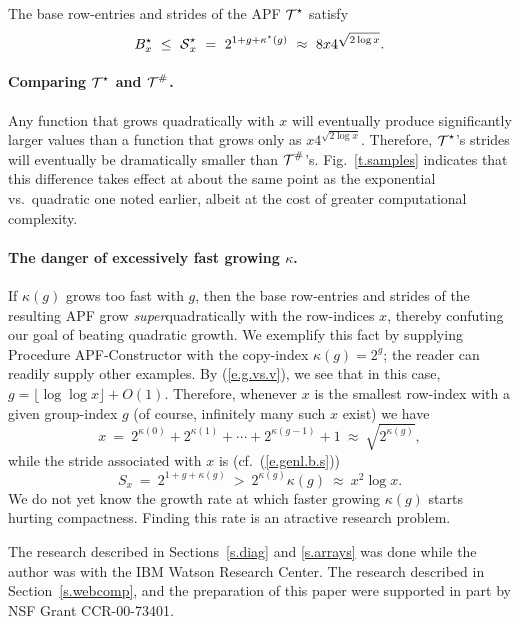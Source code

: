 \begin{prop}
The base row-entries and strides of the APF $\mbox{$\cal T$}^\star$ satisfy
\[ B^\star_x \ \leq \ \mbox{$\cal S$}^\star_x \ = \ 2^{1 + g +
    \kappa^\star(g)} \ \approx \ 8x 4^{\sqrt{2 \log x}}.  \]
\end{prop}

\paragraph{Comparing $\mbox{$\cal T$}^\star$ and $\mbox{$\cal T$}^\#$.}
Any function that grows quadratically with $x$ will eventually produce
significantly larger values than a function that grows only as $x
4^{\sqrt{2\log x}}$.  Therefore, $\mbox{$\cal T$}^\star$'s strides will eventually
be dramatically smaller than $\mbox{$\cal T$}^\#$'s.  Fig.~\ref{t.samples}
indicates that this difference takes effect at about the same point as
the exponential vs.~quadratic one noted earlier, albeit at the cost of
greater computational complexity.

\paragraph{The danger of excessively fast growing $\kappa$.}
If $\kappa(g)$ grows too fast with $g$, then the base row-entries and
strides of the resulting APF grow {\em super}quadratically with the
row-indices $x$, thereby confuting our goal of beating quadratic
growth.  We exemplify this fact by supplying Procedure {\sf
APF-Constructor} with the copy-index $\kappa(g) = 2^g$; the reader can
readily supply other examples.  By (\ref{e.g.vs.v}), we see that in
this case, $g = \lfloor \log \log x \rfloor + O(1)$.  Therefore,
whenever $x$ is the smallest row-index with a given group-index $g$
(of course, infinitely many such $x$ exist) we have
\[ x \ = \ 2^{\kappa(0)} + 2^{\kappa(1)} + \cdots + 2^{\kappa(g-1)} +
	1 \ \approx \ \sqrt{2^{\kappa(g)}}, \]
while the stride associated with $x$ is (cf.~(\ref{e.genl.b.s}))
\[ S_x \ = \ 2^{1 + g + \kappa(g)} \ > \ 2^{\kappa(g)} \kappa(g) \
	\approx \ x^2 \log x.  \]
We do not yet know the growth rate at which faster growing $\kappa(g)$
starts hurting compactness.  Finding this rate is an atractive
research problem.

\medskip

 
The research described in Sections~\ref{s.diag} and \ref{s.arrays} was
done while the author was with the IBM Watson Research Center.  The
research described in Section~\ref{s.webcomp}, and the preparation of
this paper were supported in part by NSF Grant CCR-00-73401.

